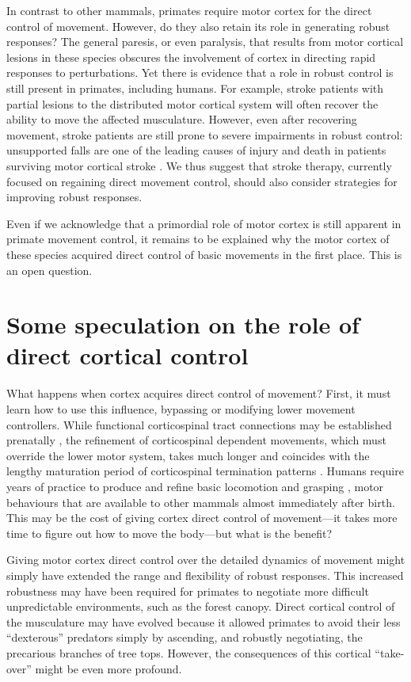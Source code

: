 In contrast to other mammals, primates require motor cortex for the direct control of movement. However, do they also retain its role in generating robust responses? The general paresis, or even paralysis, that results from motor cortical lesions in these species obscures the involvement of cortex in directing rapid responses to perturbations. Yet there is evidence that a role in robust control is still present in primates, including humans. For example, stroke patients with partial lesions to the distributed motor cortical system will often recover the ability to move the affected musculature. However, even after recovering movement, stroke patients are still prone to severe impairments in robust control: unsupported falls are one of the leading causes of injury and death in patients surviving motor cortical stroke \cite{Jacobs2014}. We thus suggest that stroke therapy, currently focused on regaining direct movement control, should also consider strategies for improving robust responses.

Even if we acknowledge that a primordial role of motor cortex is still apparent in primate movement control, it remains to be explained why the motor cortex of these species acquired direct control of basic movements in the first place. This is an open question.

\section{Some speculation on the role of direct cortical control}

What happens when cortex acquires direct control of movement? First, it must learn how to use this influence, bypassing or modifying lower movement controllers. While functional corticospinal tract connections may be established prenatally \cite{Eyre2000}, the refinement of corticospinal dependent movements, which must override the lower motor system, takes much longer and coincides with the lengthy maturation period of corticospinal termination patterns \cite{Lawrence1976}. Humans require years of practice to produce and refine basic locomotion and grasping \cite{Thelen1985,VonHofsten1989}, motor behaviours that are available to other mammals almost immediately after birth. This may be the cost of giving cortex direct control of movement---it takes more time to figure out how to move the body---but what is the benefit?

Giving motor cortex direct control over the detailed dynamics of movement might simply have extended the range and flexibility of robust responses. This increased robustness may have been required for primates to negotiate more difficult unpredictable environments, such as the forest canopy. Direct cortical control of the musculature may have evolved because it allowed primates to avoid their less ``dexterous'' predators simply by ascending, and robustly negotiating, the precarious branches of tree tops. However, the consequences of this cortical ``take-over'' might be even more profound.

